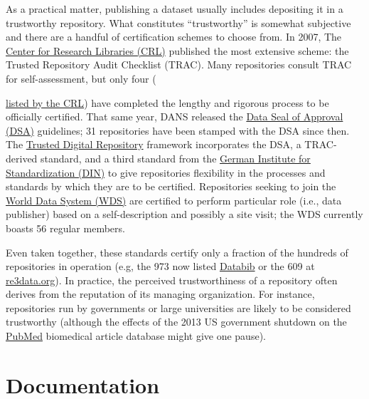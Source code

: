 \documentclass[10pt,a4paper,twocolumn]{article}
\begin{document}
{As a practical matter, publishing a dataset usually includes depositing it in a trustworthy repository.
What constitutes ``trustworthy'' is somewhat subjective and there are a handful of certification schemes to choose from.
	In 2007, The \href{http://www.crl.edu/}{Center for Research Libraries (CRL)} published the most extensive scheme: the Trusted Repository Audit Checklist (TRAC)\cite{dale_trustworthy_2007}.
Many repositories consult TRAC for self-assessment, but only four ({\href{http://www.crl.edu/archiving-preservation/digital-archives/metrics-assessing-and-certifying-0}{listed by the CRL}) have completed the lengthy and rigorous process to be officially certified.
That same year, DANS released the \href{http://datasealofapproval.org/}{Data Seal of Approval (DSA)} guidelines; 31 repositories have been stamped with the DSA since then.
The \href{http://www.trusteddigitalrepository.eu/}{Trusted Digital Repository} framework incorporates the DSA, a TRAC-derived standard, and a third standard from the \href{http://www.din.de/en}{German Institute for Standardization (DIN)} to give repositories flexibility in the processes and standards by which they are to be certified.
Repositories seeking to join the \href{https://www.icsu-wds.org/}{World Data System (WDS)} are certified to perform particular role (i.e., data publisher) based on a self-description and possibly a site visit; the WDS currently boasts 56 regular members.

Even taken together, these standards certify only a fraction of the hundreds of repositories in operation (e.g, the 973 now listed \href{http://databib.org/}{Databib} or the 609 at \href{http://www.re3data.org/}{re3data.org}).
In practice, the perceived trustworthiness of a repository often derives from the reputation of its managing organization.
For instance, repositories run by governments or large universities are likely to be considered trustworthy (although the effects of the 2013 US government shutdown on the \href{http://www.ncbi.nlm.nih.gov/pubmed/}{PubMed} biomedical article database\cite{check_hayden_nih_2013} might give one pause).


\section*{Documentation}\label{documentation}

}}
\end{document}
